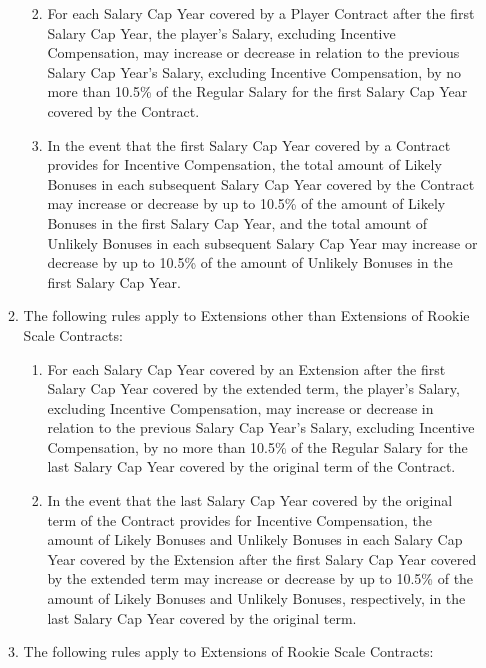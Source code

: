 \documentclass[
]{book}
\providecommand{\tightlist}{%
  \setlength{\itemsep}{0pt}\setlength{\parskip}{0pt}}
\begin{document}
\begin{enumerate}
\begin{enumerate}
    \begin{enumerate}
    \def\labelenumiii{(\roman{enumiii})}
    \tightlist
    \item
      For each Salary Cap Year covered by a Player Contract after the first Salary Cap Year, the player's Salary, excluding Incentive Compensation, may increase or decrease in relation to the previous Salary Cap Year's Salary, excluding Incentive Compensation, by no more than 10.5\% of the Regular Salary for the first Salary Cap Year covered by the Contract.
    \item
      In the event that the first Salary Cap Year covered by a Contract provides for Incentive Compensation, the total amount of Likely Bonuses in each subsequent Salary Cap Year covered by the Contract may increase or decrease by up to 10.5\% of the amount of Likely Bonuses in the first Salary Cap Year, and the total amount of Unlikely Bonuses in each subsequent Salary Cap Year may increase or decrease by up to 10.5\% of the amount of Unlikely Bonuses in the first Salary Cap Year.
    \end{enumerate}
  \item
    The following rules apply to Extensions other than Extensions of Rookie Scale Contracts:

    \begin{enumerate}
    \def\labelenumiii{(\roman{enumiii})}
    \tightlist
    \item
      For each Salary Cap Year covered by an Extension after the first Salary Cap Year covered by the extended term, the player's Salary, excluding Incentive Compensation, may increase or decrease in relation to the previous Salary Cap Year's Salary, excluding Incentive Compensation, by no more than 10.5\% of the Regular Salary for the last Salary Cap Year covered by the original term of the Contract.
    \item
      In the event that the last Salary Cap Year covered by the original term of the Contract provides for Incentive Compensation, the amount of Likely Bonuses and Unlikely Bonuses in each Salary Cap Year covered by the Extension after the first Salary Cap Year covered by the extended term may increase or decrease by up to 10.5\% of the amount of Likely Bonuses and Unlikely Bonuses, respectively, in the last Salary Cap Year covered by the original term.
    \end{enumerate}
  \item
    The following rules apply to Extensions of Rookie Scale Contracts:


\end{enumerate}
\end{enumerate}
\end{document}
